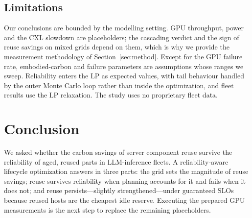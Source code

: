 \subsection{Limitations}
Our conclusions are bounded by the modelling setting. GPU throughput, power and the CXL slowdown are placeholders; the cascading verdict and the sign of reuse savings on mixed grids depend on them, which is why we provide the measurement methodology of Section~\ref{sec:method}. Except for the GPU failure rate, embodied-carbon and failure parameters are assumptions whose ranges we sweep. Reliability enters the LP as expected values, with tail behaviour handled by the outer Monte Carlo loop rather than inside the optimization, and fleet results use the LP relaxation. The study uses no proprietary fleet data.

\section{Conclusion}
\label{sec:conclusion}
We asked whether the carbon savings of server component reuse survive the reliability of aged, reused parts in LLM-inference fleets. A reliability-aware lifecycle optimization answers in three parts: the grid sets the magnitude of reuse savings; reuse survives reliability when planning accounts for it and fails when it does not; and reuse persists---slightly strengthened---under guaranteed SLOs because reused hosts are the cheapest idle reserve. Executing the prepared GPU measurements is the next step to replace the remaining placeholders.

